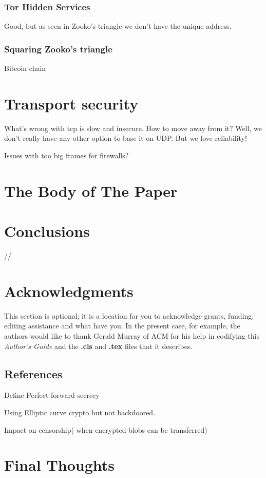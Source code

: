 \documentclass{vldb}
\begin{document}
\subsubsection{Tor Hidden Services}
Good, but as seen in Zooko's triangle we don't have the unique address.
\subsubsection{Squaring Zooko's triangle}
Bitcoin chain

\section{Transport security}
What's wrong with tcp is slow and insecure. How to move away from it? Well, we don't really have any other option to base it on UDP.
But we love reliability!

Issues with too big frames for firewalls?
\section{The {\secit Body} of The Paper}
\section{Conclusions}

//\balance

\section{Acknowledgments}
This section is optional; it is a location for you
to acknowledge grants, funding, editing assistance and
what have you.  In the present case, for example, the
authors would like to thank Gerald Murray of ACM for
his help in codifying this \textit{Author's Guide}
and the \textbf{.cls} and \textbf{.tex} files that it describes.



\subsection{References}

\begin{appendix}
Define Perfect forward secrecy

Using Elliptic curve crypto but not backdoored.

Impact on censorship( when encrypted blobs can be transferred)
\section{Final Thoughts}

\end{appendix}
\end{document}
